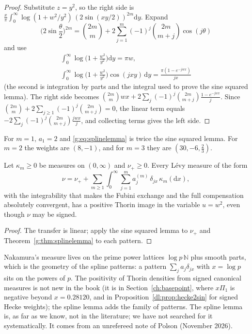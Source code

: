 \begin{proof}
Substitute $z=y^2$, so the right side is $\frac x\pi\int_0^\infty\log(1+w^2/y^2)\,(2\sin(xy/2))^{2m}\mathrm dy$. Expand
\[
\Big(2\sin\frac\theta2\Big)^{2m}=\binom{2m}{m}+2\sum_{j=1}^m(-1)^j\binom{2m}{m+j}\cos(j\theta)
\]
and use
\begin{gather*}
\int_0^\infty\log\Big(1+\frac{w^2}{y^2}\Big)\mathrm dy=\pi w,\\
\int_0^\infty\log\Big(1+\frac{w^2}{y^2}\Big)\cos(jxy)\,\mathrm dy=\frac{\pi(1-e^{-jwx})}{jx}
\end{gather*}
(the second is integration by parts and the integral used to prove the sine squared lemma). The right side becomes $\binom{2m}{m}wx+2\sum_j(-1)^j\binom{2m}{m+j}\frac{1-e^{-jwx}}{j}$. Since $\binom{2m}{m}+2\sum_{j\ge1}(-1)^j\binom{2m}{m+j}=0$, the linear term equals $-2\sum_j(-1)^j\binom{2m}{m+j}\frac{jwx}{j}$, and collecting terms gives the left side.
\end{proof}

For $m=1$, $a_1=2$ and \eqref{g:eq:splinelemma} is twice the sine squared lemma. For $m=2$ the weights are $(8,-1)$, and for $m=3$ they are $(30,-6,\frac23)$.
\begin{corollary}\label{g:cor:spline}
Let $\kappa_m\ge0$ be measures on $(0,\infty)$ and $\nu_+\ge0$. Every L\'evy measure of the form
\[
\nu=\nu_++\sum_{m\ge1}\int_0^\infty\sum_{j=1}^ma^{(m)}_j\,\delta_{jx}\,\kappa_m(\mathrm dx),
\]
with the integrability that makes the Fubini exchange and the full compensation absolutely convergent, has a positive Thorin image in the variable $u=w^2$, even though $\nu$ may be signed.
\end{corollary}

\begin{proof}
The transfer is linear; apply the sine squared lemma to $\nu_+$ and Theorem~\ref{g:thm:splinelemma} to each pattern.
\end{proof}

Nakamura's measure lives on the prime power lattices $\log p\,\mathbb N$ plus smooth parts, which is the geometry of the spline patterns: a pattern $\sum_ja_j\delta_{jx}$ with $x=\log p$ sits on the powers of $p$. The positivity of Thorin densities from signed canonical measures is not new in the book (it is in Section~\ref{ch:basepoint}, where $x\Pi_1$ is negative beyond $x=0.28120$, and in Proposition~\ref{dl:prop:hecke2sin} for signed Hecke weights); the spline lemma adds the family of patterns. The spline lemma is, as far as we know, not in the literature; we have not searched for it systematically. It comes from an unrefereed note of Polson (November 2026).

